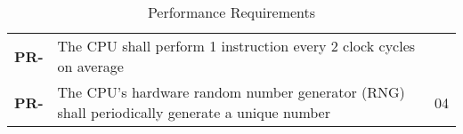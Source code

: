 \resetfyshcounter
\newcommand{\pr}[2]{
	\textbf{PR-\rc} & #1 & #2 \\
	\hline
}
\begin{table}[H]
	\begin{tabularx}{\textwidth}{| a | x | a |}
		\hline
		 &  &  \\
		\hline
		\pr{The CPU shall perform 1 instruction every 2 clock cycles on average}%
		{}

		\pr{The CPU's hardware random number generator (RNG) shall periodically generate a unique number}%
		{04}
	\end{tabularx}
	\caption{Performance Requirements}
\end{table}

